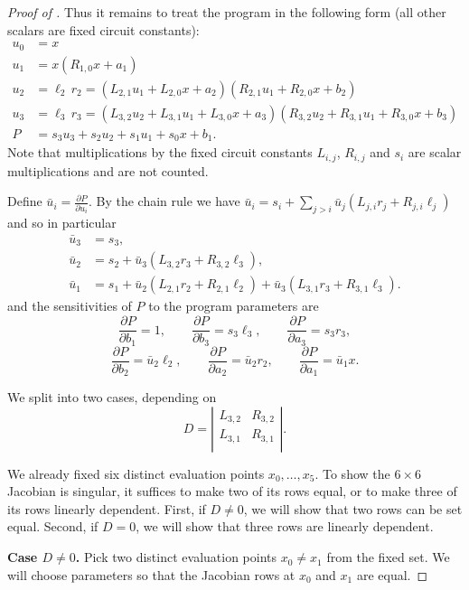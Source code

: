 \begin{proof}[Proof of ]
Thus it remains to treat the program in the following form (all other scalars are fixed circuit constants):
\begin{align}
   u_0 &= x
   \\
   u_1 &= x(R_{1,0} x + a_1)
   \\
   u_2 &= \ell_2\,r_2
   =(L_{2,1} u_1 + L_{2,0} x + a_2)
       (R_{2,1} u_1 + R_{2,0} x + b_2)
      \\
   u_3 &= \ell_3\,r_3
   =(L_{3,2} u_2 + L_{3,1} u_1 + L_{3,0} x + a_3)
       (R_{3,2} u_2 + R_{3,1} u_1 + R_{3,0} x + b_3)
   \\
   P &= s_3 u_3 + s_2 u_2 + s_1 u_1 + s_0 x + b_1.
\end{align}
Note that multiplications by the fixed circuit constants $L_{i,j}$, $R_{i,j}$ and
$s_i$ are scalar multiplications and are not counted.

Define $\bar u_i = \frac{\partial P}{\partial u_i}$.
By the chain rule we have
$\bar u_i = s_i + \sum_{j>i} \bar u_j (L_{j,i} r_j + R_{j,i} \ell_j)$
and so in particular
\begin{align}
   \bar u_3 &= s_3, \\
   \bar u_2 &= s_2 + \bar u_3 (L_{3,2} r_3 + R_{3,2} \ell_3), \\
   \bar u_1 &= s_1 + \bar u_2 (L_{2,1} r_2 + R_{2,1} \ell_2)
      + \bar u_3 (L_{3,1} r_3 + R_{3,1} \ell_3).
\end{align}
and the sensitivities of $P$ to the program parameters are
\[
   \frac{\partial P}{\partial b_1}=1,\qquad
   \frac{\partial P}{\partial b_3}=s_3 \ell_3,\qquad
   \frac{\partial P}{\partial a_3}=s_3 r_3,
\]
\[
   \frac{\partial P}{\partial b_2}=\bar u_2 \ell_2,\qquad
   \frac{\partial P}{\partial a_2}=\bar u_2 r_2,\qquad
   \frac{\partial P}{\partial a_1}=\bar u_1 x.
\]

We split into two cases, depending on
\[
   D = \left|
   \begin{matrix}
      L_{3,2} & R_{3,2} \\
      L_{3,1} & R_{3,1} \\
   \end{matrix}
   \right|.
\]

We already fixed six distinct evaluation points $x_0,\dots,x_5$.
To show the $6\times 6$ Jacobian is singular, it suffices to make two of its rows equal, or to make three of its rows linearly dependent.
First, if $D\neq 0$, we will show that two rows can be set equal.
Second, if $D=0$, we will show that three rows are linearly dependent.

\medskip
\noindent\textbf{Case $D\neq 0$.}
Pick two distinct evaluation points $x_0\neq x_1$ from the fixed set.
We will choose parameters so that the Jacobian rows at $x_0$ and $x_1$ are equal.


\end{proof}
